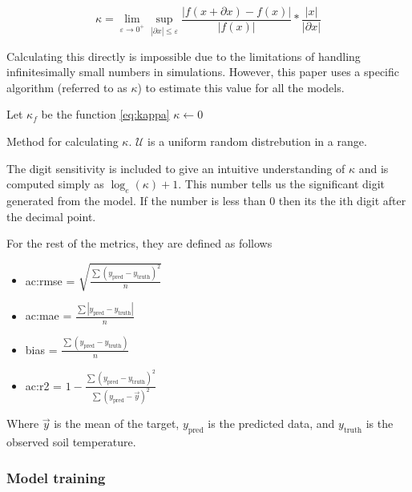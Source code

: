 \begin{equation}\label{eq:kappa}
\kappa = \lim\limits_{\varepsilon \to 0^+} \sup\limits_{|\partial x|\leq\varepsilon}  \frac{\left|f(x+\partial x) - f(x)\right|}{|f(x)|}*\frac{|x|}{|\partial x|} 
\end{equation}

Calculating this directly is impossible due to the limitations of handling infinitesimally small numbers in simulations. However, this paper uses a specific algorithm (referred to as $\kappa$) to estimate this value for all the models.

\begin{algorithm}[H]
	\SetAlgoLined
	Let $\kappa_f$ be the function \ref{eq:kappa}\;
	$\kappa\gets 0$\;
	\Return{$\kappa$}
	\caption[Randommised $\kappa$ algorithm]{Method for calculating $\kappa$. $\mathcal{U}$ is a uniform random distrebution in a range.}
	\label{alg:cond_num}
\end{algorithm}

The digit sensitivity is included to give an intuitive understanding of $\kappa$ and is computed simply as $\log_e(\kappa)+1$. This number tells us the significant digit generated from the model. If the number is less than 0 then its the ith digit after the decimal point.

For the rest of the metrics, they are defined as follows
\begin{itemize}
	\item \gls{ac:rmse} = $\sqrt{\frac{\sum (y_{\text{pred}} - y_{\text{truth}})^2}{n}}$
	\item \gls{ac:mae} = $\frac{\sum \left| y_{\text{pred}} - y_{\text{truth}}\right|}{n}$
	\item bias = $\frac{\sum ( y_{\text{pred}} - y_{\text{truth}})}{n}$
	\item \gls{ac:r2} = $1-\frac{\sum (y_{\text{pred}} - y_{\text{truth}})^2}{\sum (y_{\text{pred}} - \vec{y})^2}$
\end{itemize}

Where $\vec{y}$ is the mean of the target, $y_{\text{pred}}$ is the predicted data, and $y_{\text{truth}}$ is the observed soil temperature.

\subsubsection{Model training}

